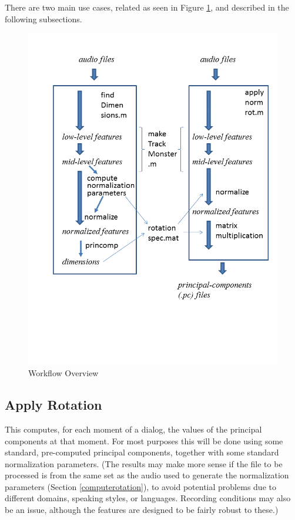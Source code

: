 \documentclass[11pt]{article}
\begin{document}
There are two main use cases, related as seen in Figure \ref{diagram},
and described in the following subsections.

\begin{figure}[thp]
 \centerline{ 
 \includegraphics[width=11.4cm, trim = 0.cm 4.3cm 0cm 1.5cm, clip=true]{workflow-overview}
}
\caption{Workflow Overview}
\label{diagram}
\end{figure}


\subsection{Apply Rotation}    \label{applynormrot}
 
This computes, for each moment of a dialog, the values of the
principal components at that moment.  For most purposes this will be
done using some standard, pre-computed principal components, together
with some standard normalization parameters.  (The results may make
more sense if the file to be processed is from the same set as the
audio used to generate the normalization parameters (Section
\ref{computerotation}), to avoid potential problems due to
different domains, speaking styles, or languages.  Recording
conditions may also be an issue, although the features are designed to
be fairly robust to these.)
\end{document}
